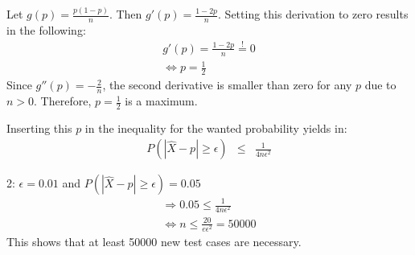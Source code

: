 \documentclass{article}
\begin{document}
Let $g(p) = \frac{p(1-p)}{n}$. Then $g'(p) = \frac{1-2p}{n}$. Setting this derivation to zero results in the following:
\begin{eqnarray}
g'(p) = \frac{1-2p}{n} \overset{!}{=} 0\\
\Leftrightarrow p = \frac{1}{2}
\end{eqnarray}
Since $g''(p) = -\frac{2}{n}$, the second derivative is smaller than zero for any $p$ due to $n > 0$. Therefore, $p = \frac{1}{2}$ is a maximum.

Inserting this $p$ in the inequality for the wanted probability yields in:
\begin{eqnarray}
P(|\hat{X} - p| \geq \epsilon) &\leq& \frac{1}{4n\epsilon^2}
\end{eqnarray}

2: $\epsilon = 0.01$ and $P(|\hat{X} - p| \geq \epsilon) = 0.05$
\begin{eqnarray}
\Rightarrow 0.05 \leq \frac{1}{4n\epsilon^2}\\
\Leftrightarrow n \leq \frac{20}{e\epsilon^2} = 50000
\end{eqnarray}
This shows that at least 50000 new test cases are necessary.
\end{document}
